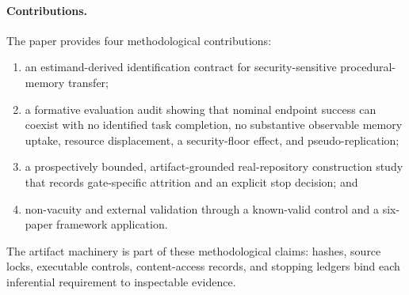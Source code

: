 \paragraph{Contributions.}
The paper provides four methodological contributions:
\begin{enumerate}[leftmargin=*,itemsep=2pt,topsep=3pt]
  \item an estimand-derived identification contract for security-sensitive
  procedural-memory transfer;
  \item a formative evaluation audit showing that nominal endpoint success can
  coexist with no identified task completion, no substantive observable
  memory uptake, resource displacement, a security-floor effect, and
  pseudo-replication;
  \item a prospectively bounded, artifact-grounded real-repository construction
  study that records gate-specific attrition and an explicit stop decision;
  and
  \item non-vacuity and external validation through a known-valid control and a
  six-paper framework application.
\end{enumerate}
The artifact machinery is part of these methodological claims: hashes, source
locks, executable controls, content-access records, and stopping ledgers bind
each inferential requirement to inspectable evidence.
